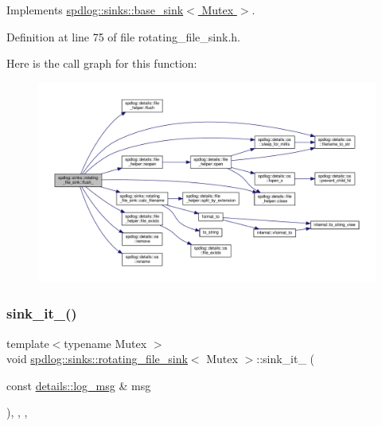 Implements \hyperlink{classspdlog_1_1sinks_1_1base__sink_a5ac2b237c60f68a18122a1ca09b812b4}{spdlog\+::sinks\+::base\+\_\+sink$<$ Mutex $>$}.



Definition at line 75 of file rotating\+\_\+file\+\_\+sink.\+h.

Here is the call graph for this function\+:
\nopagebreak
\begin{figure}[H]
\begin{center}
\leavevmode
\includegraphics[width=350pt]{classspdlog_1_1sinks_1_1rotating__file__sink_ae93e4792b76f73bb0be8e50b5c5e889b_cgraph}
\end{center}
\end{figure}
\mbox{\label{classspdlog_1_1sinks_1_1rotating__file__sink_a3cf93e445ad92380c7d352f971cd76a4}} 
\subsubsection{\texorpdfstring{sink\+\_\+it\+\_\+()}{sink\_it\_()}}
{\footnotesize\ttfamily template$<$typename Mutex $>$ \\
void \hyperlink{classspdlog_1_1sinks_1_1rotating__file__sink}{spdlog\+::sinks\+::rotating\+\_\+file\+\_\+sink}$<$ Mutex $>$\+::sink\+\_\+it\+\_\+ (\begin{DoxyParamCaption}\item[{const \hyperlink{structspdlog_1_1details_1_1log__msg}{details\+::log\+\_\+msg} \&}]{msg }\end{DoxyParamCaption})\hspace{0.3cm}{\ttfamily [inline]}, {\ttfamily [override]}, {\ttfamily [protected]}, {\ttfamily [virtual]}}



